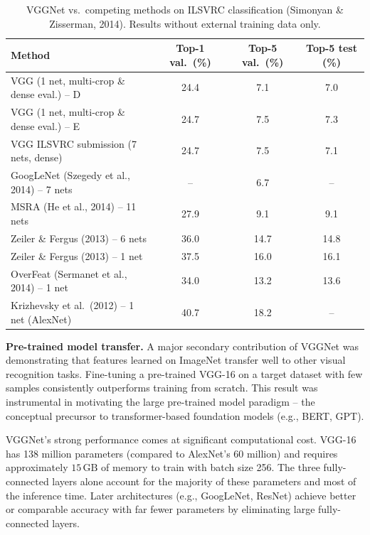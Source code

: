 \documentclass[12pt,a4paper]{article}
\begin{document}
\begin{table}[ht]
\centering
\caption{VGGNet vs.\ competing methods on ILSVRC classification (Simonyan \& Zisserman, 2014). Results without external training data only.}
\label{tab:vgg_comparison}
\small
\begin{tabular}{@{}lccc@{}}
\toprule
Method & Top-1 val.\ (\%) & Top-5 val.\ (\%) & Top-5 test (\%) \\
\midrule
VGG (1 net, multi-crop \& dense eval.) -- D  & 24.4 & 7.1  & 7.0 \\
VGG (1 net, multi-crop \& dense eval.) -- E  & 24.7 & 7.5  & 7.3 \\
VGG ILSVRC submission (7 nets, dense)        & 24.7 & 7.5  & 7.1 \\
GoogLeNet (Szegedy et al., 2014) -- 7 nets   & --   & 6.7  & -- \\
MSRA (He et al., 2014) -- 11 nets            & 27.9 & 9.1  & 9.1 \\
Zeiler \& Fergus (2013) -- 6 nets            & 36.0 & 14.7 & 14.8 \\
Zeiler \& Fergus (2013) -- 1 net             & 37.5 & 16.0 & 16.1 \\
OverFeat (Sermanet et al., 2014) -- 1 net    & 34.0 & 13.2 & 13.6 \\
Krizhevsky et al.\ (2012) -- 1 net (AlexNet) & 40.7 & 18.2 & --  \\
\bottomrule
\end{tabular}
\end{table}

\begin{example}
\textbf{Pre-trained model transfer.} A major secondary contribution of VGGNet was demonstrating that features learned on ImageNet transfer well to other visual recognition tasks. Fine-tuning a pre-trained VGG-16 on a target dataset with few samples consistently outperforms training from scratch. This result was instrumental in motivating the large pre-trained model paradigm -- the conceptual precursor to transformer-based foundation models (e.g., BERT, GPT).
\end{example}

\begin{warningbox}
VGGNet's strong performance comes at significant computational cost. VGG-16 has 138 million parameters (compared to AlexNet's 60 million) and requires approximately $15\,\text{GB}$ of memory to train with batch size 256. The three fully-connected layers alone account for the majority of these parameters and most of the inference time. Later architectures (e.g., GoogLeNet, ResNet) achieve better or comparable accuracy with far fewer parameters by eliminating large fully-connected layers.
\end{warningbox}
\end{document}
